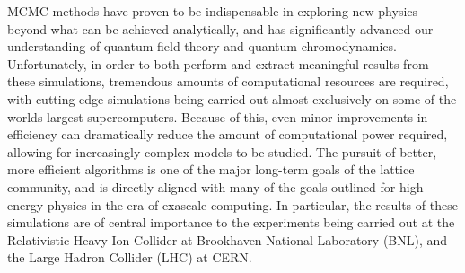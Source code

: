 \documentclass[../main.tex]{subfiles}
\begin{document}
MCMC methods have proven to be indispensable in exploring new physics beyond
what can be achieved analytically, and has significantly advanced our
understanding of quantum field theory and quantum chromodynamics.
%
Unfortunately, in order to both perform and  extract meaningful results from
these simulations, tremendous amounts of computational resources are required,
with cutting-edge simulations being carried out almost exclusively on some of
the worlds largest supercomputers.
%
Because of this, even minor improvements in efficiency can dramatically reduce
the amount of computational power
required, allowing for increasingly complex models to be studied.
%
The pursuit of better, more efficient algorithms is one of the major long-term
goals of the lattice community, and is
directly aligned with many of the goals outlined for high energy physics in the
era of exascale computing. 
%
In particular, the results of these simulations are of central importance to
the experiments being carried out at the
Relativistic Heavy Ion Collider at Brookhaven National Laboratory (BNL), and
the Large Hadron Collider (LHC) at CERN.
\end{document}
